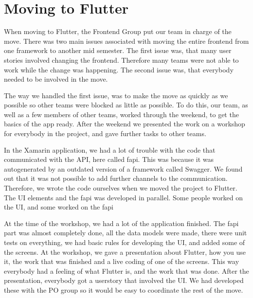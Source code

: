 \section{Moving to Flutter}
When moving to Flutter, the Frontend Group put our team in charge of the move. 
There was two main issues associated with moving the entire frontend from one framework to another mid semester.
The first issue was, that many user stories involved changing the frontend. Therefore many teams were not able to work while the change was happening.
The second issue was, that everybody needed to be involved in the move. 

The way we handled the first issue, was to make the move as quickly as we possible so other teams were blocked as little as possible.
To do this, our team, as well as a few members of other teams, worked through the weekend, to get the basics of the app ready. After the weekend we presented the work on a workshop for everybody in the project, and gave further tasks to other teams.

In the Xamarin application, we had a lot of trouble with the code that communicated with the API, here called \gls{fapi}. This was because it was autogenerated by an outdated version of a framework called Swagger. We found out that it was not possible to add further channels to the communication. Therefore, we wrote the code ourselves when we moved the project to Flutter. The UI elements and the \gls{fapi} was developed in parallel. Some people worked on the UI, and some worked on the \gls{fapi}

At the time of the workshop, we had a lot of the application finished. The \gls{fapi} part was almost completely done, all the data models were made, there were unit tests on everything, we had basic rules for developing the UI, and added some of the screens. 
At the workshop, we gave a presentation about Flutter, how you use it, the work that was finished and a live coding of one of the screens. This way everybody had a feeling of what Flutter is, and the work that was done. 
After the presentation, everybody got a userstory that involved the UI. We had developed these with the \gls{PO} group so it would be easy to coordinate the rest of the move.  
